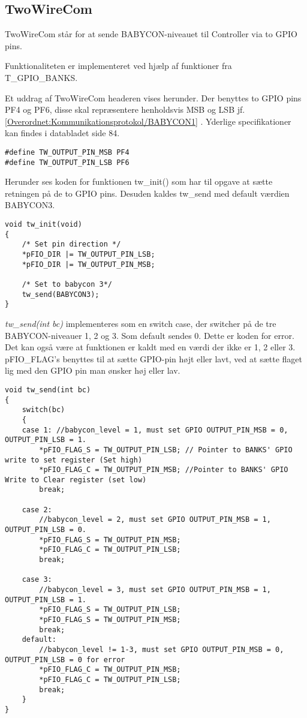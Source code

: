 \subsection{TwoWireCom}
TwoWireCom står for at sende BABYCON-niveauet til Controller via to GPIO pins. 

Funktionaliteten er implementeret ved hjælp af funktioner fra T\_GPIO\_BANKS. 

Et uddrag af TwoWireCom headeren vises herunder.
Der benyttes to GPIO pins PF4 og PF6, disse skal repræsentere henholdsvis MSB og LSB jf. \ref{Overordnet:Kommunikationsprotokol/BABYCON1} . Yderlige specifikationer kan findes i databladet \citep{AD1836} side 84. 

\begin{verbatim}
#define TW_OUTPUT_PIN_MSB PF4
#define TW_OUTPUT_PIN_LSB PF6
\end{verbatim}

Herunder ses koden for funktionen tw\_init() som har til opgave at sætte retningen på de to GPIO pins. Desuden kaldes tw\_send med default værdien BABYCON3. 
\begin{verbatim}
void tw_init(void)
{
    /* Set pin direction */
    *pFIO_DIR |= TW_OUTPUT_PIN_LSB;
    *pFIO_DIR |= TW_OUTPUT_PIN_MSB;

    /* Set to babycon 3*/
    tw_send(BABYCON3);
}
\end{verbatim}

\textit{tw\_send(int bc)} implementeres som en switch case, der switcher på de tre BABYCON-niveauer 1, 2 og 3. Som default sendes 0. Dette er koden for error. Det kan også være at funktionen er kaldt med en værdi der ikke er 1, 2 eller 3.  
pFIO\_FLAG's benyttes til at sætte GPIO-pin højt eller lavt, ved at sætte flaget lig med den GPIO pin man ønsker høj eller lav. 

\begin{verbatim}
void tw_send(int bc)
{
    switch(bc)
    {
    case 1:	//babycon_level = 1, must set GPIO OUTPUT_PIN_MSB = 0, OUTPUT_PIN_LSB = 1.
        *pFIO_FLAG_S = TW_OUTPUT_PIN_LSB; // Pointer to BANKS' GPIO write to set register (Set high)
        *pFIO_FLAG_C = TW_OUTPUT_PIN_MSB; //Pointer to BANKS' GPIO Write to Clear register (set low)
        break;

    case 2:
        //babycon_level = 2, must set GPIO OUTPUT_PIN_MSB = 1, OUTPUT_PIN_LSB = 0.
        *pFIO_FLAG_S = TW_OUTPUT_PIN_MSB;
        *pFIO_FLAG_C = TW_OUTPUT_PIN_LSB;
        break;

    case 3:
        //babycon_level = 3, must set GPIO OUTPUT_PIN_MSB = 1, OUTPUT_PIN_LSB = 1.
        *pFIO_FLAG_S = TW_OUTPUT_PIN_LSB;
        *pFIO_FLAG_S = TW_OUTPUT_PIN_MSB;
        break;
    default:
        //babycon_level != 1-3, must set GPIO OUTPUT_PIN_MSB = 0, OUTPUT_PIN_LSB = 0 for error
        *pFIO_FLAG_C = TW_OUTPUT_PIN_MSB;
        *pFIO_FLAG_C = TW_OUTPUT_PIN_LSB;
        break;
    }
}
\end{verbatim}